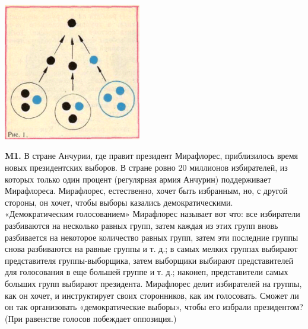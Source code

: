\documentclass{article}
\begin{document}
	\pagecolor{color1bg}

	\begin{multicols}{2}
		\setlength{\columnsep}{40em}
		\hspace{-15px}\includegraphics[width=0.45\textwidth]{Картинки/Рисунок 1.png}
		\vspace{0.5cm}
		
		\par
		\fontsize{14pt}{16pt}\selectfont
		{\small{}\textbf{M1.} В стране Анчурии, где правит 
			президент Мирафлорес, приблизилось время новых президентских выборов. В стране ровно 20 миллионов избирателей, из которых только один процент (регулярная армия Анчурин) поддерживает Мирафлореса. Мирафлорес, естественно, хочет быть избранным, но, с другой стороны, он хочет, чтобы выборы казались демократическими. «Демократическим голосованием» Мирафлорес называет вот что: все избиратели разбиваются на несколько равных групп, затем каждая из этих групп вновь разбивается на некоторое количество равных групп, затем эти последние группы снова разбиваются на равные группы и т. д.; в самых мелких группах выбирают представителя группы-выборщика, затем выборщики выбирают представителей для голосования в еще большей группе и т. д.; наконеп, представители самых больших групп выбирают президента. Мирафлорес делит избирателей на группы, как он хочет, и инструктирует своих сторонников, как им голосовать. Сможет ли он так организовать «демократические выборы», чтобы его избрали президентом? (При равенстве голосов побеждает оппозиция.)}
		

\end{multicols}
\end{document}
